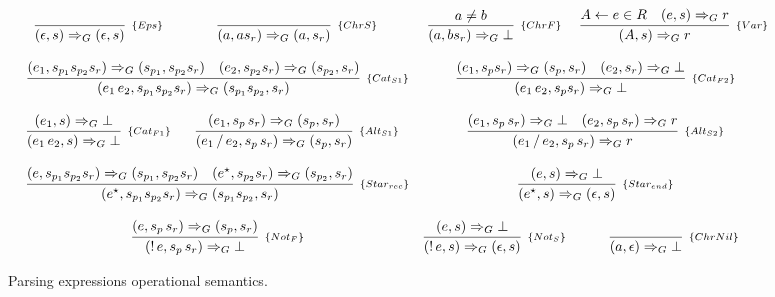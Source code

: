 \documentclass[sigplan,screen]{acmart}
\theoremstyle{definition}
\begin{document}
\begin{figure}[h!]
   \[
      \begin{array}{cccc}
         \infer[_{\{Eps\}}]{(\epsilon,s)\Rightarrow_G (\epsilon,s)}{} &
         \infer[_{\{ChrS\}}]{(a,as_r) \Rightarrow_G (a,s_r)}{}  &
         \infer[_{\{ChrF\}}]{(a,bs_r) \Rightarrow_G \bot}{a \neq b} &
         \infer[_{\{Var\}}]{(A,s) \Rightarrow_G r}
                           {A \leftarrow e \in R & (e,s) \Rightarrow_G r} \\ \\
         \multicolumn{2}{c}{
            \infer[_{\{Cat_{S1}\}}]{(e_1\,e_2,s_{p_1}s_{p_2}s_r) \Rightarrow_G (s_{p_1}s_{p_2}, s_r)}
                                 {(e_1,s_{p_1}s_{p_2}s_r) \Rightarrow_G (s_{p_1},s_{p_2}s_r) &
                                 (e_2,s_{p_2}s_r)\Rightarrow_G (s_{p_2},s_r)}
         } &
         \multicolumn{2}{c}{
            \infer[_{\{Cat_{F2}\}}]{(e_1\,e_2,s_ps_r) \Rightarrow_G \bot}
                                 { (e_1,s_ps_r) \Rightarrow_G (s_p,s_r) &
                                    (e_2,s_r) \Rightarrow_G \bot}} \\ \\
         \infer[_{\{Cat_{F1}\}}]{(e_1\,e_2,s)\Rightarrow_G \bot}{(e_1,s) \Rightarrow_G \bot} &
         \infer[_{\{Alt_{S1}\}}]{(e_1\,/\,e_2,s_p\,s_r) \Rightarrow_G (s_p,s_r)}
                                {(e_1,s_p\,s_r)\Rightarrow_G (s_p,s_r)} &
         \multicolumn{2}{c}{
            \infer[_{\{Alt_{S2}\}}]{(e_1\,/\,e_2,s_p\,s_r) \Rightarrow_G r}
                                  {(e_1,s_p\,s_r)\Rightarrow_G \bot &
                                   (e_2,s_p\,s_r)\Rightarrow_G r}
         } \\ \\
         \multicolumn{2}{c}{
            \infer[_{\{Star_{rec}\}}]{(e^\star,s_{p_1}s_{p_2}s_r) \Rightarrow_G (s_{p_1}s_{p_2},s_r)}
                                 {(e,s_{p_1}s_{p_2}s_r) \Rightarrow_G (s_{p_1},s_{p_2}s_r) &
                                  (e^\star, s_{p_2}s_r) \Rightarrow_G (s_{p_2},s_r)}
         } &
         \multicolumn{2}{c}{
            \infer[_{\{Star_{end}\}}]{(e^\star,s) \Rightarrow_G (\epsilon,s)}
                                    {(e,s) \Rightarrow_G \bot}} \\ \\
         \multicolumn{2}{c}{
            \infer[_{\{Not_F\}}]{(!\,e,s_p\,s_r) \Rightarrow_G \bot}
                               {(e,s_p\,s_r) \Rightarrow_G (s_p,s_r)}
         } &
         \infer[_{\{Not_S\}}]{(!\,e,s) \Rightarrow_G (\epsilon,s)}
         {(e,s) \Rightarrow_G \bot}
           &
         \infer[_{\{ChrNil\}}]{(a,\epsilon) \Rightarrow_G \bot}{}
      \end{array}
   \]
   \centering
   \caption{Parsing expressions operational semantics.}
   \label{fig:pegsemantics}
\end{figure}
\end{document}

